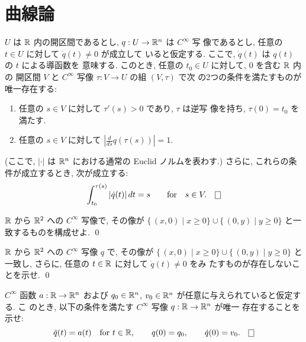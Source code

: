 \documentclass[12pt,twoside]{jarticle}
\begin{document}

\section{曲線論}

\begin{question}[弧長パラメーター]\label{q:alp}
  $U$ は ${\mathbb R}$ 内の開区間であるとし, $q : U \to {\mathbb R}^n$ は $C^\infty$ 写
  像であるとし, 任意の $t\in U$ に対して $\dot{q}(t) \ne 0$ が成立して
  いると仮定する. ここで, $\dot{q}(t)$ は $q(t)$ の $t$ による導函数を
  意味する. このとき, 任意の $t_0\in U$ に対して, $0$ を含む ${\mathbb R}$ 内の
  開区間 $V$ と $C^\infty$ 写像 $\tau : V \to U$ の組 $(V, \tau)$ で次
  の2つの条件を満たすものが唯一存在する:
  \begin{enumerate}
  \item 任意の $s \in V$ に対して $\tau'(s) > 0$ であり, $\tau$ は逆写
    像を持ち, $\tau(0) = t_0$ を満たす.
  \item 任意の $s \in V$ に対して 
    $\displaystyle \left| \frac{d}{ds}q(\tau(s)) \right| = 1$.
  \end{enumerate}
  (ここで, $|\cdot|$ は ${\mathbb R}^n$ における通常の Euclid ノルムを表わす.) 
  さらに, これらの条件が成立するとき, 次が成立する:
  \[
    \int_{t_0}^{\tau(s)} |\dot{q}(t)| \,dt = s
    \qquad\text{for}\quad s \in V.
    \qed
  \]
\end{question}

\begin{question}
  ${\mathbb R}$ から ${\mathbb R}^2$ への $C^\infty$ 写像で, その像が
  \(
    \{\, (x, 0) \mid x \ge 0 \}
    \cup
    \{\, (0, y) \mid y \ge 0 \}
  \)
  と一致するものを構成せよ. \qed
\end{question}

\begin{question}
  ${\mathbb R}$ から ${\mathbb R}^2$ への $C^\infty$ 写像 $q$ で, その像が
  \(
    \{\, (x, 0) \mid x \ge 0 \}
    \cup
    \{\, (0, y) \mid y \ge 0 \}
  \)%
  と一致し, さらに, 任意の $t \in {\mathbb R}$ に対して $\dot{q}(t) \ne 0$ をみ
  たすものが存在しないことを示せ. \qed
\end{question}

\begin{question}
  $C^\infty$ 函数 $a : {\mathbb R} \to {\mathbb R}^n$ および %
  $q_0 \in {\mathbb R}^n$, $v_0 \in {\mathbb R}^n$ が任意に与えられていると仮定する. こ
  のとき, 以下の条件を満たす $C^\infty$ 写像 $q : {\mathbb R} \to {\mathbb R}^n$ が唯一
  存在することを示せ:
  \[
    \ddot{q}(t) = a(t) \quad\text{for $t\in \R$},
    \qquad
    q(0) = q_0,
    \qquad
    \dot{q}(0) = v_0.
  \qed
  \]
\end{question}
\end{document}
